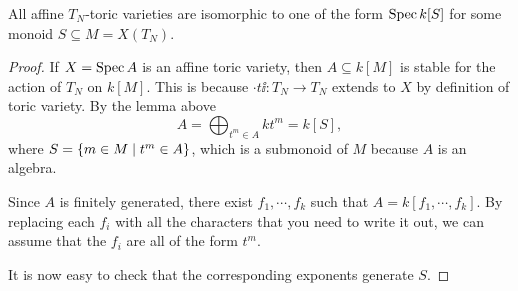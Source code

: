 \begin{theorem}[]\label{ThAffineToricVarietiesComeFromAffineMonoids}
All affine $T_N$-toric varieties are isomorphic to one of the form $\operatorname{Spec} k[S]$ for some monoid $S\subseteq M=X(T_N)$.
\end{theorem}
\begin{proof}
If $X=\operatorname{Spec} A$ is an affine toric variety, then $A\subseteq k[M]$ is stable for the action of $T_N$ on $k[M]$. This is because $\cdot t\ii:T_N\to T_N$ extends to $X$ by definition of toric variety.
By the lemma above
\[A=\bigoplus_{t^m\in A}k t^m=k[S],\]
where $S=\left\{{m\in M\mid t^m\in A}\right\}$, which is a submonoid of $M$ because $A$ is an algebra.

Since $A$ is finitely generated, there exist $f_1,\cdots, f_k$ such that $A=k[f_1,\cdots, f_k]$. By replacing each $f_i$ with all the characters that you need to write it out, we can assume that the $f_i$ are all of the form $t^m$.

It is now easy to check that the corresponding exponents generate $S$.
\end{proof}






















